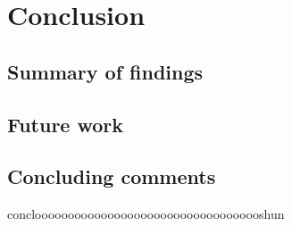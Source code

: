 \chapter{Conclusion}
\section{Summary of findings}

\section{Future work}

\section{Concluding comments}


conclooooooooooooooooooooooooooooooooooshun